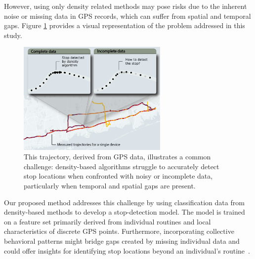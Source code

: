 \documentclass{article}
\begin{document}
However, using only density related methods may pose risks due to the inherent noise or missing data in GPS records, which can suffer from spatial and temporal gaps. Figure \ref{fig:fig_problem_setup} provides a visual representation of the problem addressed in this study.

\begin{figure}[ht]
    \includegraphics[width=0.65\textwidth]{./Images/Figure_problem_explaination.png}
	\centering
	\caption{This trajectory, derived from GPS data, illustrates a common challenge: density-based algorithms struggle to accurately detect stop locations when confronted with noisy or incomplete data, particularly when temporal and spatial gaps are present. %
 }
	\label{fig:fig_problem_setup}
\end{figure}

Our proposed method addresses this challenge by using classification data from density-based methods to develop a stop-detection model. The model is trained on a feature set primarily derived from individual routines and local characteristics of discrete GPS points. Furthermore, incorporating collective behavioral patterns might bridge gaps created by missing individual data and could offer insights for identifying stop locations beyond an individual's routine~\citep{Bontorin2024a}.


\end{document}
